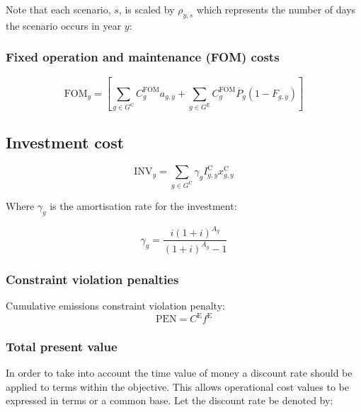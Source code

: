 \documentclass{article}
\newcommand{\sGeneratorsExisting}{G^{\mathrm{E}}}
\newcommand{\sGeneratorsCandidate}{G^{\mathrm{C}}}
\newcommand{\iGenerator}{g}
\newcommand{\iYear}{y}
\newcommand{\iScenario}{s}
\newcommand{\cFixedOperationsMaintenanceCost}[1][\iYear]{\mathrm{FOM}_{#1}}
\newcommand{\cFixedOperationsMaintenanceCostGenerator}[1][\iGenerator]{C^{\mathrm{FOM}}_{#1}}
\newcommand{\cScenarioDuration}[1][\iYear,\iScenario]{\rho_{#1}}
\newcommand{\cPowerOutputMax}[1][\iGenerator,\iYear]{\overline{P}_{#1}}
\newcommand{\cAmortisationRate}[1][\iGenerator]{\gamma_{#1}}
\newcommand{\cCandidateInvestmentCost}[1][\iGenerator,\iYear]{I^{\mathrm{C}}_{#1}}
\newcommand{\cInvestmentCost}[1][\iYear]{\mathrm{INV}_{#1}}
\newcommand{\cInterestRate}{i}
\newcommand{\cAssetLifetime}[1][\iGenerator]{A_{#1}}
\newcommand{\cEmissionsTargetViolationPenalty}{C^{\mathrm{E}}}
\newcommand{\cEmissionsViolationTotalCost}{\mathrm{PEN}}
\newcommand{\cRetirementIndicator}[1][\iGenerator,\iYear]{F_{#1}}
\newcommand{\vInstalledCapacity}[1][\iGenerator,\iYear]{x^{\mathrm{C}}_{#1}}
\newcommand{\vEmissionsTargetViolation}{f^{\mathrm{E}}}
\newcommand{\vInstalledCapacityTotal}[1][\iGenerator,\iYear]{a_{#1}}
\begin{document}
Note that each scenario, $\iScenario$, is scaled by $\cScenarioDuration$ which represents the number of days the scenario occurs in year $\iYear$:

\subsubsection{Fixed operation and maintenance (FOM) costs}

\begin{equation}
\cFixedOperationsMaintenanceCost = \left[\sum\limits_{\iGenerator \in \sGeneratorsCandidate} \cFixedOperationsMaintenanceCostGenerator \vInstalledCapacityTotal + \sum\limits_{\iGenerator \in \sGeneratorsExisting} \cFixedOperationsMaintenanceCostGenerator \cPowerOutputMax[\iGenerator] \left(1 - \cRetirementIndicator\right) \right]
\end{equation}

\subsection{Investment cost}

\begin{equation}
\cInvestmentCost = \sum\limits_{g\in \sGeneratorsCandidate} \cAmortisationRate  \cCandidateInvestmentCost \vInstalledCapacity
\end{equation}

Where $\cAmortisationRate$ is the amortisation rate for the investment:

\begin{equation}
\cAmortisationRate = \frac{\cInterestRate(1+\cInterestRate)^{\cAssetLifetime}}{(1+\cInterestRate)^{\cAssetLifetime} - 1}
\end{equation}

\subsubsection{Constraint violation penalties}
Cumulative emissions constraint violation penalty:
\begin{equation}
\cEmissionsViolationTotalCost = \cEmissionsTargetViolationPenalty \vEmissionsTargetViolation
\end{equation}

\subsubsection{Total present value}
In order to take into account the time value of money a discount rate should be applied to terms within the objective. This allows operational cost values to be expressed in terms or a common base. Let the discount rate be denoted by:
\end{document}
